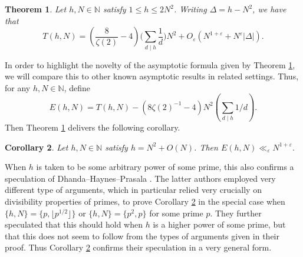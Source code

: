 \documentclass[12pt,reqno]{amsart}
\newtheorem{theorem}{Theorem}[section]
\newtheorem{corollary}[theorem]{Corollary}
\theoremstyle{definition}
\theoremstyle{remark}
\numberwithin{equation}{section}
\renewcommand{\leq}{\leqslant}
\def\eps{\varepsilon}
\newcommand\1{\mathds{1}}
\begin{document}
\begin{theorem} \label{thm1.3}
    Let $h, N \in \mathbb{N}$ satisfy  $1 \leq h \leq 2N^2$. Writing $\Delta = h -N^2$, we have that
    \[ T(h,N) = \left(\frac{8}{\zeta(2)} - 4\right) \bigg(\sum_{d\mid h}\frac{1}{d}\bigg)N^2 + O_{\eps}(N^{1+ \eps}+ N^{\eps}|\Delta|).  \]
\end{theorem}

In order to highlight the novelty of the asymptotic formula given by Theorem \ref{thm1.3}, we will compare this to other known asymptotic results in related settings. Thus, for any $h, N \in \mathbb{N}$, define 
\[ E(h,N) = T(h,N) - (8\zeta(2)^{-1} - 4) N^2 (\sum_{d\mid h}1/d).\]
Then Theorem \ref{thm1.3} delivers the following corollary.

\begin{corollary} \label{cor1.4}
    Let $h, N \in \mathbb{N}$ satisfy $h = N^2 + O(N)$. Then $E(h,N) \ll_{\eps}  N^{1 + \eps}.$
\end{corollary}

When $h$ is taken to be some arbitrary power of some prime, this also confirms a speculation of Dhanda--Haynes--Prasala \cite{DHP2025}. The latter authors employed very different type of arguments, which in particular relied very crucially on divisibility properties of primes, to prove Corollary \ref{cor1.4} in the special case when $\{h,N\} = \{p, \lfloor p^{1/2} \rfloor\}$ or $\{h,N\} = \{p^2,p\}$ for some prime $p$. They further speculated that this should hold when $h$ is a higher power of some prime, but that this does not seem to follow from the types of arguments given in their proof. Thus Corollary \ref{cor1.4} confirms their speculation in a very general form.
\end{document}
